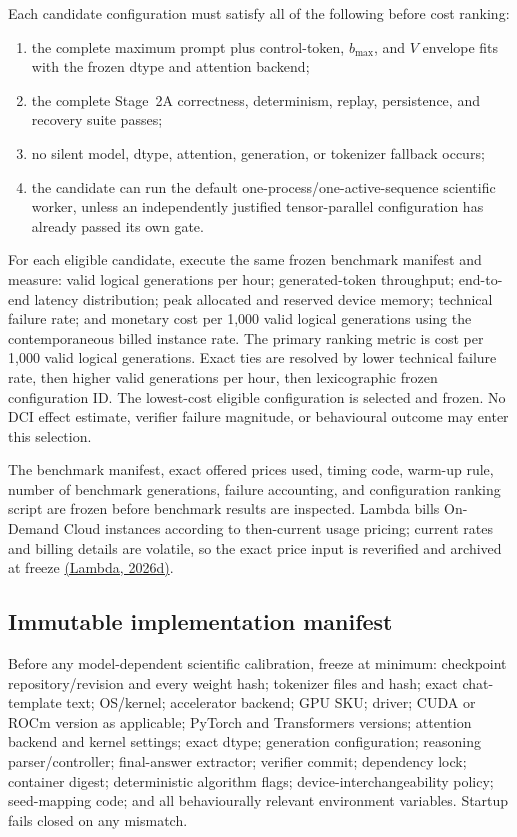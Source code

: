 \documentclass[11pt,a4paper]{article}
\begin{document}
Each candidate configuration must satisfy all of the following before cost ranking:
\begin{enumerate}
\item the complete maximum prompt plus control-token, $b_{\max}$, and $V$ envelope fits with the frozen dtype and attention backend;
\item the complete Stage~2A correctness, determinism, replay, persistence, and recovery suite passes;
\item no silent model, dtype, attention, generation, or tokenizer fallback occurs;
\item the candidate can run the default one-process/one-active-sequence scientific worker, unless an independently justified tensor-parallel configuration has already passed its own gate.
\end{enumerate}

For each eligible candidate, execute the same frozen benchmark manifest and measure: valid logical generations per hour; generated-token throughput; end-to-end latency distribution; peak allocated and reserved device memory; technical failure rate; and monetary cost per 1,000 valid logical generations using the contemporaneous billed instance rate. The primary ranking metric is cost per 1,000 valid logical generations. Exact ties are resolved by lower technical failure rate, then higher valid generations per hour, then lexicographic frozen configuration ID. The lowest-cost eligible configuration is selected and frozen. No DCI effect estimate, verifier failure magnitude, or behavioural outcome may enter this selection.

The benchmark manifest, exact offered prices used, timing code, warm-up rule, number of benchmark generations, failure accounting, and configuration ranking script are frozen before benchmark results are inspected. Lambda bills On-Demand Cloud instances according to then-current usage pricing; current rates and billing details are volatile, so the exact price input is reverified and archived at freeze \href{https://docs.lambda.ai/public-cloud/billing/}{(Lambda, 2026d)}.

\subsection{Immutable implementation manifest}
Before any model-dependent scientific calibration, freeze at minimum: checkpoint repository/revision and every weight hash; tokenizer files and hash; exact chat-template text; OS/kernel; accelerator backend; GPU SKU; driver; CUDA or ROCm version as applicable; PyTorch and Transformers versions; attention backend and kernel settings; exact dtype; generation configuration; reasoning parser/controller; final-answer extractor; verifier commit; dependency lock; container digest; deterministic algorithm flags; device-interchangeability policy; seed-mapping code; and all behaviourally relevant environment variables. Startup fails closed on any mismatch.
\end{document}
